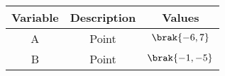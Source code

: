 \begin{tabular}[12pt]{ |c|c|c|}
    \hline
    \textbf{Variable} & \textbf{Description} & \textbf{Values}\\ 
    \hline
    A & Point & $\brak{-6,7}$\\
    \hline
    B & Point & $\brak{-1,-5}$ \\
    \hline
    \end{tabular}

